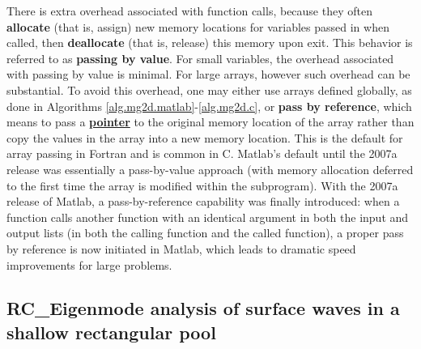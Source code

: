 \enlargethispage{10pt}

There is extra overhead associated with function calls, because they often
{\bf allocate} (that is, assign) new memory locations for variables passed in when called, then {\bf deallocate} (that is, release) this memory
upon exit.  This behavior is referred to as {\bf passing by value}.  For small variables, the overhead associated with passing by value is minimal.
For large arrays, however such overhead can be substantial.  To avoid this overhead, one may either use arrays defined globally,
as done in Algorithms \ref{alg.mg2d.matlab}-\ref{alg.mg2d.c}, or {\bf pass by reference}, which means to pass a \href{http://www.cs.stanford.edu/cslibrary/PointerFunCBig.avi}{\bf pointer}
to the original memory location of the array rather than copy the values in the array into a new memory location.
This is the default for array passing in Fortran and is common in C.  Matlab's default until the 2007a release was essentially a pass-by-value approach (with memory allocation deferred
to the first time the array is modified within the subprogram).  With the 2007a release of Matlab, a pass-by-reference capability was finally introduced:
when a function calls another function with an identical argument in both the input and output lists (in both the calling function and the called function),
a proper pass by reference is now initiated in Matlab, which leads to dramatic speed improvements for large problems.

\subsection{RC_Eigenmode analysis of surface waves in a shallow rectangular pool}\label{sec.A.C.B.2d}
\enlargethispage{10pt}

